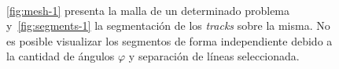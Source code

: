 \documentclass[11pt]{article}
\numberwithin{equation}{section}
\begin{document}
\begin{figure}[!h]
 \begin{center}
  \\
  \caption{\ref{fig:mesh-1} presenta la malla de un determinado problema y~\ref{fig:segments-1} la segmentación de los \emph{tracks} sobre la misma. No es posible visualizar los segmentos de forma independiente debido a la cantidad de ángulos $\varphi$ y separación de líneas seleccionada.}
  \label{fig:mesh-and-segments-1}
 \end{center}
\end{figure}
\end{document}
